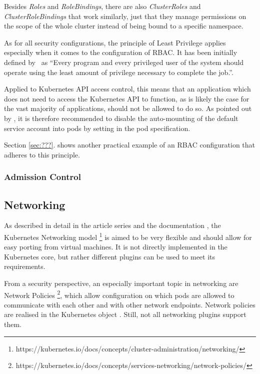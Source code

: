 Besides \textit{Roles} and \textit{RoleBindings}, there are also \textit{ClusterRoles} and \textit{ClusterRoleBindings} that work similarly, just that they manage permissions on the scope of the whole cluster instead of being bound to a specific namespace.

As for all security configurations, the principle of Least Privilege applies especially when it comes to the configuration of RBAC. It has been initially defined by~\textcite{leastPrivilege} as \enquote{Every program and every privileged user of the system should operate using the least amount of privilege necessary to complete the job.}. 

Applied to Kubernetes API access control, this means that an application which does not need to access the Kubernetes API to function, as is likely the case for the vast majority of applications, should not be allowed to do so. As pointed out by \textcite{kubernetessecurity}, it is therefore recommended to disable the auto-mounting of the default service account into pods by setting  in the pod specification. 



Section \ref{sec:???}. shows another practical example of an RBAC configuration that adheres to this principle.



\subsubsection{Admission Control} \label{admissionControl}


\subsection{Networking}

As described in detail in the article series \textcite{NetworkingExplained} and the documentation \textcite{k8sdocs}, the Kubernetes Networking model \footnote{https://kubernetes.io/docs/concepts/cluster-administration/networking/} is aimed to be very flexible and should allow for easy porting from virtual machines. It is not directly implemented in the Kubernetes core, but rather different plugins can be used to meet its requirements.

From a security perspective, an especially important topic in networking are Network Policies \footnote{https://kubernetes.io/docs/concepts/services-networking/network-policies/}, which allow configuration on which pods are allowed to communicate with each other and with other network endpoints. Network policies are realised in the Kubernetes object . Still, not all networking plugins support them.

